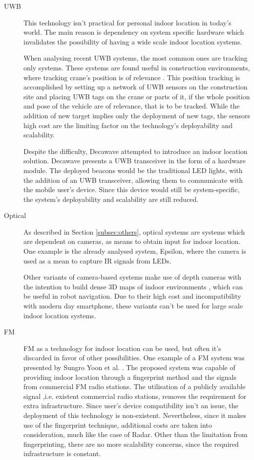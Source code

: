 \begin{description}
 
 
 
\item[\acf{UWB}] This technology isn't practical for personal indoor location in today's world. The main reason is dependency on system specific hardware which invalidates the possibility of having a wide scale indoor location systems. 
 
 
When analysing recent \ac{UWB} systems, the most common ones are tracking only systems. These systems are found useful in construction environments, where tracking crane's position is of relevance \cite{uwb-ex1}. This position tracking is accomplished by setting up a network of \ac{UWB} sensors on the construction site and placing \ac{UWB} tags on the crane or parts of it, if the whole position and pose of the vehicle are of relevance, that is to be tracked. While the addition of new target implies only the deployment of new tags, the sensors high cost are the limiting factor on the technology's deployability and scalability.  
 
 
Despite the difficulty, Decawave \cite{uwb-ex2} attempted to introduce an indoor location solution. Decawave presents a \ac{UWB} transceiver in the form of a hardware module. The deployed beacons would be the traditional LED lights, with the addition of an \ac{UWB} transceiver, allowing them to communicate with the mobile user's device. Since this device would still be system-specific, the system's deployability and scalability are still reduced. 
 
 
\item [Optical] As described in Section \ref{subsec:others}, optical systems are systems which are dependent on cameras, as means to obtain input for indoor location. One example is the already analysed system, Epsilon, where the camera is used as a mean to capture \ac{IR} signals from LEDs.  
 
 
Other variants of camera-based systems make use of depth cameras with the intention to build dense 3D maps of indoor environments \cite{camera_ex}, which can be useful in robot navigation. Due to their high cost and incompatibility with modern day smartphone, these variants can't be used for large scale indoor location systems. 
 
 
\item[FM]  FM as a technology for indoor location can be used, but often it's discarded in favor of other possibilities. One example of a FM system was presented by Sungro Yoon et al. \cite{fm_ex}. The proposed system was capable of providing indoor location through a fingerprint method and the signals from commercial \ac{FM} radio stations. The utilisation of a publicly available signal ,i.e. existent commercial radio stations, removes the requirement for extra infrastructure. Since user's device compatibility isn't an issue, the deployment of this technology is non-existent. Nevertheless, since it makes use of the fingerprint technique, additional costs are taken into consideration, much like the case of Radar. Other than the limitation from fingerprinting, there are no more scalability concerns, since the required infrastructure is constant. 
 

\end{description}
